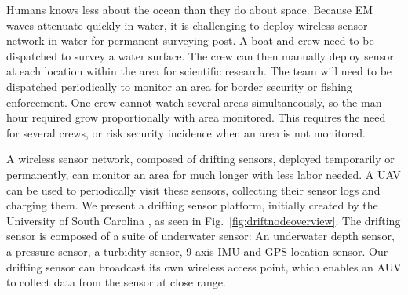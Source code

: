 Humans knows less about the ocean than they do about space.
Because EM waves attenuate quickly in water, it is challenging to deploy wireless sensor network in water for permanent surveying post.
A boat and crew need to be dispatched to survey a water surface.
The crew can then manually deploy sensor at each location within the area for scientific research.
The team will need to be dispatched periodically to monitor an area for border security or fishing enforcement.
One crew cannot watch several areas simultaneously, so the man-hour required grow proportionally with area monitored.
This requires the need for several crews, or risk security incidence when an area is not monitored.

A wireless sensor network, composed of drifting sensors, deployed temporarily or permanently, can monitor an area for much longer with less labor needed.
A UAV can be used to periodically visit these sensors, collecting their sensor logs and charging them.
We present a drifting sensor platform, initially created by the University of South Carolina \cite{drifterUSC}, as seen in Fig.~\ref{fig:driftnodeoverview}.
The drifting sensor is composed of a suite of underwater sensor: An underwater depth sensor, a pressure sensor, a turbidity sensor, 9-axis IMU and GPS location sensor.
Our drifting sensor can broadcast its own wireless access point, which enables an AUV to collect data from the sensor at close range.
